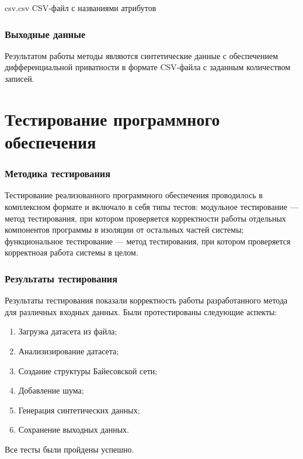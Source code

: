 {csv.csv} %
{CSV-файл с названиями атрибутов} %

\subsubsection{Выходные данные}

Результатом работы методы являются синтетические данные с обеспечением дифференциальной приватности в формате CSV-файла с заданным количеством записей.

\section{Тестирование программного обеспечения}

\subsubsection{Методика тестирования}

Тестирование реализованного программного обеспечения проводилось в комплексном формате и включало в себя типы тестов: модульное тестирование --- метод тестирования, при котором проверяется корректности работы отдельных компонентов программы в изоляции от остальных частей системы; функциональное тестирование --- метод тестирования, при котором проверяется корректноая работа системы в целом.

\subsubsection{Результаты тестирования}

Результаты тестирования показали корректность работы разработанного метода для различных входных данных. Были протестированы следующие аспекты:
\begin{enumerate}[label*=---]
	\item Загрузка датасета из файла;
	\item Анализизирование датасета;
	\item Создание структуры Байесовской сети;
	\item Добавление шума;
	\item Генерация синтетических данных;
	\item Сохранение выходных данных.
\end{enumerate}

Все тесты были пройдены успешно.

